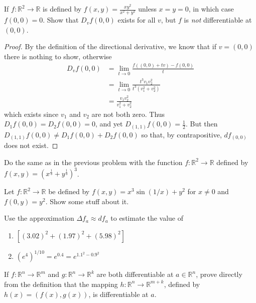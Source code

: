 \question If \( f: \mathbb{R}^2 \rightarrow \mathbb{R} \) is defined by \( f(x,y) = \frac{xy^2}{x^2+y^2} \) unless \( x = y = 0 \), in which case \( f(0,0)=0 \). Show that \( D_vf(0,0) \) exists for all \( v \), but \( f \) is \emph{not} differentiable at \( (0,0) \).

\begin{proof}
By the definition of the directional derivative, we know that if \( v = (0,0) \) there is nothing to show, otherwise
\begin{align*}
    D_vf(0,0) &= \lim_{t \rightarrow 0} \frac{f((0,0)+tv)-f(0,0)}{t} \\
    &= \lim_{t \rightarrow 0}\frac{t^3v_1v_2^2}{t^3(v_1^2+v_2^2)} \\
    &= \frac{v_1v_2^2}{v_1^2+v_2^2}
\end{align*}
which exists since \( v_1 \) and \( v_2 \) are not both zero. Thus \( D_1f(0,0) = D_2f(0,0) = 0 \), and yet \( D_{(1,1)}  f(0,0) = \frac{1}{2} \). But then \( D_{(1,1)}f(0,0) \neq D_1f(0,0)+D_2f(0,0) \) so that, by contrapositive, \( df_{(0,0)} \) does not exist. 
\end{proof}

\question Do the same as in the previous problem with the function \(f: \mathbb{R}^2 \rightarrow \mathbb{R} \) defined by \( f(x,y) = (x^{\frac{1}{3}}+y^{\frac{1}{3}})^3 \).

\question Let \( f: \mathbb{R}^2 \rightarrow \mathbb{R} \) be defined by \( f(x,y) = x^3\sin(1/x)+y^2 \) for \( x \neq 0 \) and \( f(0,y) = y^2 \). Show some stuff about it.

\question Use the approximation \( \Delta f_a \approx df_a \) to estimate the value of 
\begin{enumerate}
    \item \( [(3.02)^2+(1.97)^2+(5.98)^2] \)
    
    \item \( (e^4)^{1/10}= e^{0.4} = e^{1.1^2-0.9^2} \)
\end{enumerate}

\question

\question 

\question If \( f: \mathbb{R}^n \rightarrow \mathbb{R}^m \) and \( g: \mathbb{R}^n \rightarrow \mathbb{R}^k \) are both differentiable at \( a \in \mathbb{R}^n \), prove directly from the definition that the mapping \( h:\mathbb{R}^n \rightarrow \mathbb{R}^{m+k} \), defined by \( h(x) = (f(x),g(x)) \), is differentiable at \( a \).

